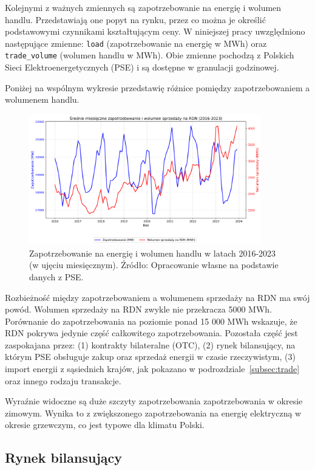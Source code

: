 Kolejnymi z ważnych zmiennych są zapotrzebowanie na energię i wolumen handlu. Przedstawiają one popyt na rynku, przez co można je określić podstawowymi czynnikami kształtującym ceny. W niniejszej pracy uwzględniono następujące zmienne: \texttt{load} (zapotrzebowanie na energię w MWh) oraz \texttt{trade\_volume} (wolumen handlu w MWh). Obie zmienne pochodzą z Polskich Sieci Elektroenergetycznych (PSE) i są dostępne w granulacji godzinowej.

Poniżej na wspólnym wykresie przedstawię różnice pomiędzy zapotrzebowaniem a wolumenem handlu.

\begin{figure}[H]
    \centering
    \includegraphics[width=0.9\textwidth]{../plots/market/load_vs_volume_2016_2024.png}
    \caption{Zapotrzebowanie na energię i wolumen handlu w latach 2016-2023 (w ujęciu miesięcznym). Źródło: Opracowanie własne na podstawie danych z PSE.}
    \label{fig:load_vs_trade_volume}
\end{figure}

Rozbieżność między zapotrzebowaniem a wolumenem sprzedaży na RDN ma swój powód. Wolumen sprzedaży na RDN zwykle nie przekracza 5000 MWh. Porównanie do zapotrzebowania na poziomie ponad 15 000  MWh wskazuje, że RDN pokrywa jedynie część całkowitego zapotrzebowania. Pozostała część jest zaspokajana przez: (1) kontrakty bilateralne (OTC), (2) rynek bilansujący, na którym PSE obsługuje zakup oraz sprzedaż energii w czasie rzeczywistym, (3) import energii z sąsiednich krajów, jak pokazano w podrozdziale~\ref{subsec:trade} oraz innego rodzaju transakcje. 

Wyraźnie widoczne są duże szczyty zapotrzebowania zapotrzebowania w okresie zimowym. Wynika to z zwiększonego zapotrzebowania na energię elektryczną w okresie grzewczym, co jest typowe dla klimatu Polski.

\subsection{Rynek bilansujący}
\label{subsec:balancing_market}

